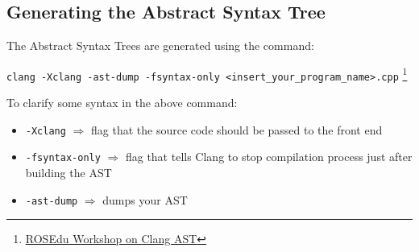 \documentclass{article}
\begin{document}
\subsection{Generating the Abstract Syntax Tree}
\begin{flushleft}
The Abstract Syntax Trees are generated using the command:

\begin{center}
\texttt{clang -Xclang -ast-dump -fsyntax-only <insert\_your\_program\_name>.cpp} \footnote{\href{http://workshop.rosedu.org/2014/sesiuni/compiler/ast}{ROSEdu Workshop on Clang AST}}
\end{center}

To clarify some syntax in the above command:
\begin{itemize}
\item \texttt{-Xclang} \(\Rightarrow\) flag that the source code should be passed to the front end
\item \texttt{-fsyntax-only} \(\Rightarrow\) flag that tells Clang to stop compilation process just after building the AST
\item \texttt{-ast-dump} \(\Rightarrow\) dumps your AST
\end{itemize}

\end{flushleft}
\end{document}
